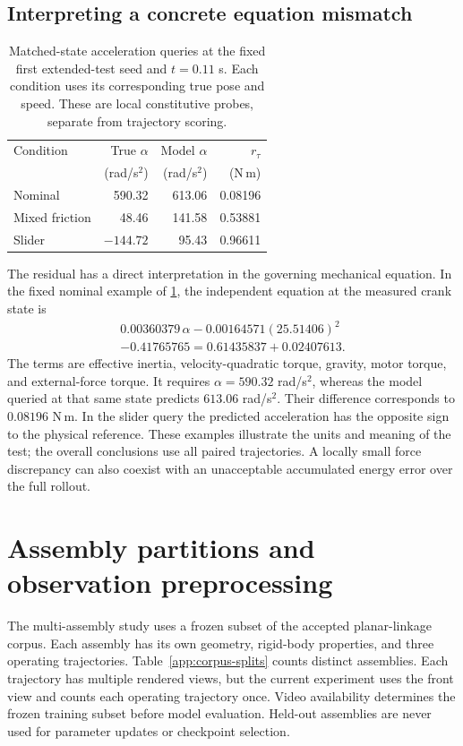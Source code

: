 \subsection{Interpreting a concrete equation mismatch}
\begin{table}[t]
\caption{Matched-state acceleration queries at the fixed first extended-test seed and $t=0.11$ s. Each condition uses its corresponding true pose and speed. These are local constitutive probes, separate from trajectory scoring.}
\label{tab:local}
\centering
\small
\begin{tabular}{lrrr}
\toprule
Condition & True $\alpha$ & Model $\alpha$ & $r_\tau$\\
& (rad/s$^2$) & (rad/s$^2$) & (N\,m)\\
\midrule
Nominal & 590.32 & 613.06 & 0.08196\\
Mixed friction & 48.46 & 141.58 & 0.53881\\
Slider & $-144.72$ & 95.43 & 0.96611\\
\bottomrule
\end{tabular}
\end{table}
The residual has a direct interpretation in the governing mechanical equation. In the fixed nominal example of \cref{tab:local}, the independent equation at the measured crank state is
\begin{equation}
\begin{split}
0.00360379\,\alpha
-0.00164571(25.51406)^2\\
-0.41765765=0.61435837+0.02407613.
\end{split}
\label{eq:worked}
\end{equation}
The terms are effective inertia, velocity-quadratic torque, gravity, motor torque, and external-force torque. It requires $\alpha=590.32$ rad/s$^2$, whereas the model queried at that same state predicts $613.06$ rad/s$^2$. Their difference corresponds to $0.08196$ N\,m. In the slider query the predicted acceleration has the opposite sign to the physical reference. These examples illustrate the units and meaning of the test; the overall conclusions use all paired trajectories. A locally small force discrepancy can also coexist with an unacceptable accumulated energy error over the full rollout.



\section{Assembly partitions and observation preprocessing}
\label{app:corpus-data}
The multi-assembly study uses a frozen subset of the accepted planar-linkage corpus. Each assembly has its own geometry, rigid-body properties, and three operating trajectories. Table~\ref{app:corpus-splits} counts distinct assemblies. Each trajectory has multiple rendered views, but the current experiment uses the front view and counts each operating trajectory once. Video availability determines the frozen training subset before model evaluation. Held-out assemblies are never used for parameter updates or checkpoint selection.

